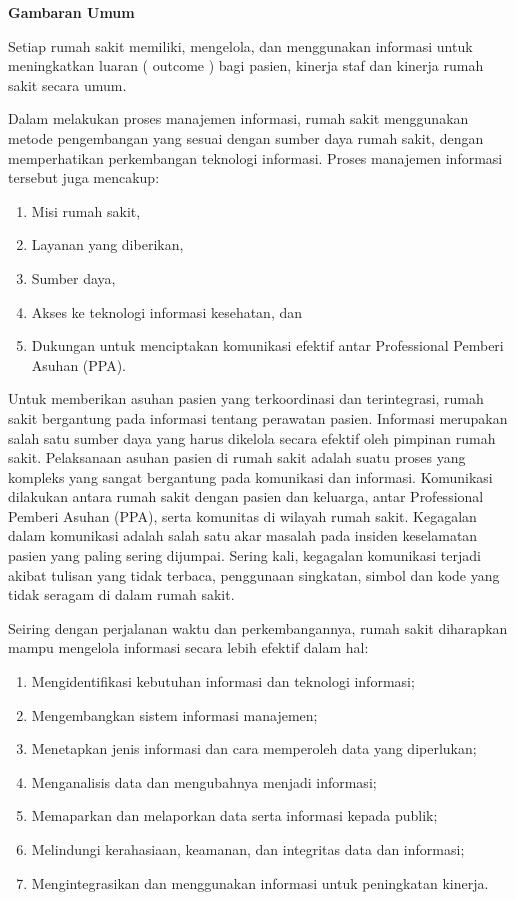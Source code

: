 \documentclass[
]{book}
\providecommand{\tightlist}{%
  \setlength{\itemsep}{0pt}\setlength{\parskip}{0pt}}
\begin{document}
\textbf{Gambaran Umum}

Setiap rumah sakit memiliki, mengelola, dan menggunakan informasi untuk meningkatkan luaran ( outcome ) bagi pasien, kinerja staf dan kinerja rumah sakit secara umum.

Dalam melakukan proses manajemen informasi, rumah sakit menggunakan metode pengembangan yang sesuai dengan sumber daya rumah sakit, dengan memperhatikan perkembangan teknologi informasi. Proses manajemen informasi tersebut juga mencakup:

\begin{enumerate}
\def\labelenumi{\alph{enumi}.}
\tightlist
\item
  Misi rumah sakit,
\item
  Layanan yang diberikan,
\item
  Sumber daya,
\item
  Akses ke teknologi informasi kesehatan, dan
\item
  Dukungan untuk menciptakan komunikasi efektif antar Professional Pemberi Asuhan (PPA).
\end{enumerate}

Untuk memberikan asuhan pasien yang terkoordinasi dan terintegrasi, rumah sakit bergantung pada informasi tentang perawatan pasien. Informasi merupakan salah satu sumber daya yang harus dikelola secara efektif oleh pimpinan rumah sakit.
Pelaksanaan asuhan pasien di rumah sakit adalah suatu proses yang kompleks yang sangat bergantung pada komunikasi dan informasi. Komunikasi dilakukan antara rumah sakit dengan pasien dan keluarga, antar Professional Pemberi Asuhan (PPA), serta komunitas di wilayah rumah sakit. Kegagalan dalam komunikasi adalah salah satu akar masalah pada insiden keselamatan pasien yang paling sering dijumpai. Sering kali, kegagalan komunikasi terjadi akibat tulisan yang tidak terbaca, penggunaan singkatan, simbol dan kode yang tidak seragam di dalam rumah sakit.

Seiring dengan perjalanan waktu dan perkembangannya, rumah sakit diharapkan mampu mengelola informasi secara lebih efektif dalam hal:

\begin{enumerate}
\def\labelenumi{\alph{enumi}.}
\tightlist
\item
  Mengidentifikasi kebutuhan informasi dan teknologi informasi;
\item
  Mengembangkan sistem informasi manajemen;
\item
  Menetapkan jenis informasi dan cara memperoleh data yang diperlukan;
\item
  Menganalisis data dan mengubahnya menjadi informasi;
\item
  Memaparkan dan melaporkan data serta informasi kepada publik;
\item
  Melindungi kerahasiaan, keamanan, dan integritas data dan informasi;
\item
  Mengintegrasikan dan menggunakan informasi untuk peningkatan kinerja.
\end{enumerate}
\end{document}
